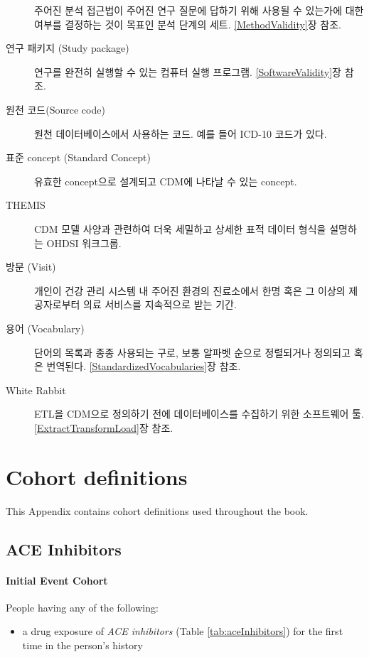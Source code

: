 \documentclass[11pt]{book}
\providecommand{\tightlist}{%
  \setlength{\itemsep}{0pt}\setlength{\parskip}{0pt}}
\theoremstyle{definition}
\theoremstyle{definition}
\theoremstyle{definition}
\theoremstyle{remark}
\begin{document}
\begin{description}
주어진 분석 접근법이 주어진 연구 질문에 답하기 위해 사용될 수 있는가에
대한 여부를 결정하는 것이 목표인 분석 단계의 세트.
\ref{MethodValidity}장 참조.
\item[연구 패키지 (Study package)]
연구를 완전히 실행할 수 있는 컴퓨터 실행 프로그램.
\ref{SoftwareValidity}장 참조.
\item[원천 코드(Source code)]
원천 데이터베이스에서 사용하는 코드. 예를 들어 ICD-10 코드가 있다.
\item[표준 concept (Standard Concept)]
유효한 concept으로 설계되고 CDM에 나타날 수 있는 concept.
\item[THEMIS]
CDM 모델 사양과 관련하여 더욱 세밀하고 상세한 표적 데이터 형식을
설명하는 OHDSI 워크그룹.
\item[방문 (Visit)]
개인이 건강 관리 시스템 내 주어진 환경의 진료소에서 한명 혹은 그 이상의
제공자로부터 의료 서비스를 지속적으로 받는 기간.
\item[용어 (Vocabulary)]
단어의 목록과 종종 사용되는 구로, 보통 알파벳 순으로 정렬되거나 정의되고
혹은 번역된다. \ref{StandardizedVocabularies}장 참조.
\item[White Rabbit]
ETL을 CDM으로 정의하기 전에 데이터베이스를 수집하기 위한 소프트웨어 툴.
\ref{ExtractTransformLoad}장 참조.
\end{description}

\chapter{Cohort definitions}\label{CohortDefinitions}

This Appendix contains cohort definitions used throughout the book.

\section{ACE Inhibitors}\label{AceInhibitors}

\subsubsection*{Initial Event Cohort}\label{initial-event-cohort}

People having any of the following:

\begin{itemize}
\tightlist
\item
  a drug exposure of \emph{ACE inhibitors} (Table
  \ref{tab:aceInhibitors}) for the first time in the person's history
\end{itemize}
\end{document}
